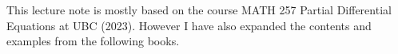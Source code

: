 \documentclass[12pt]{article}
\begin{document}

This lecture note is mostly based on the course MATH 257 Partial Differential Equations at UBC (2023). However I have also expanded the contents and examples from the following books.



\newpage


\end{document}
